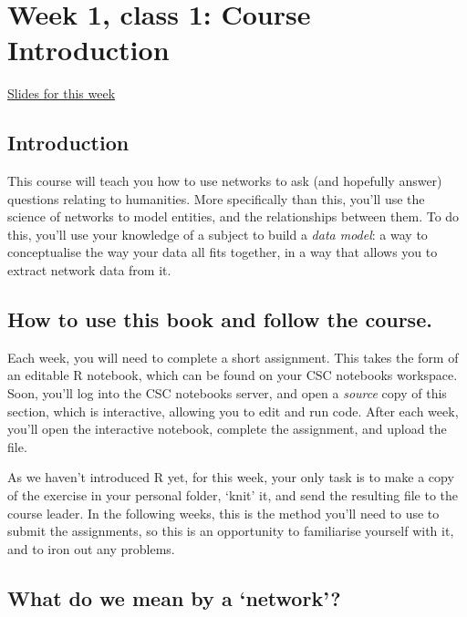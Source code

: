 \documentclass[
]{book}
\begin{document}
\hypertarget{week-1-class-1-course-introduction}{%
\chapter{Week 1, class 1: Course Introduction}\label{week-1-class-1-course-introduction}}

\href{https://comhis.github.io/applying-network-analysis-to-humanities/slides/1-1-introduction.html\#/title-slide}{Slides for this week}

\hypertarget{introduction}{%
\section{Introduction}\label{introduction}}

This course will teach you how to use networks to ask (and hopefully answer) questions relating to humanities. More specifically than this, you'll use the science of networks to model entities, and the relationships between them. To do this, you'll use your knowledge of a subject to build a \emph{data model}: a way to conceptualise the way your data all fits together, in a way that allows you to extract network data from it.

\hypertarget{how-to-use-this-book-and-follow-the-course.}{%
\section{How to use this book and follow the course.}\label{how-to-use-this-book-and-follow-the-course.}}

Each week, you will need to complete a short assignment. This takes the form of an editable R notebook, which can be found on your CSC notebooks workspace. Soon, you'll log into the CSC notebooks server, and open a \emph{source} copy of this section, which is interactive, allowing you to edit and run code. After each week, you'll open the interactive notebook, complete the assignment, and upload the file.

As we haven't introduced R yet, for this week, your only task is to make a copy of the exercise in your personal folder, `knit' it, and send the resulting file to the course leader. In the following weeks, this is the method you'll need to use to submit the assignments, so this is an opportunity to familiarise yourself with it, and to iron out any problems.

\hypertarget{what-do-we-mean-by-a-network}{%
\section{What do we mean by a `network'?}\label{what-do-we-mean-by-a-network}}
\end{document}
